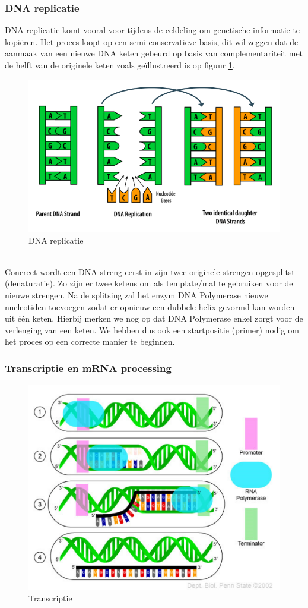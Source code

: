 \documentclass[a4paper,kul]{kulakarticle} %
\begin{document}
\subsubsection{DNA replicatie}
DNA replicatie komt vooral voor tijdens de celdeling om genetische informatie te kopiëren. Het proces loopt op een semi-conservatieve basis, dit wil zeggen dat de aanmaak van een nieuwe DNA keten gebeurd op basis van complementariteit met de helft van de originele keten zoals geïllustreerd is op figuur \ref{fig:dnareplicatie}.\\ 
\begin{figure}[h]
	\centering
	\includegraphics[width=0.7\linewidth]{DNAReplicatie}
	\caption[DNA replicatie]{DNA replicatie}
	\label{fig:dnareplicatie}
\end{figure}\\
Concreet wordt een DNA streng eerst in zijn twee originele strengen opgesplitst (denaturatie). Zo zijn er twee ketens om als template/mal te gebruiken voor de nieuwe strengen. Na de splitsing zal het enzym DNA Polymerase nieuwe nucleotiden toevoegen zodat er opnieuw een dubbele helix gevormd kan worden uit één keten. Hierbij merken we nog op dat DNA Polymerase enkel zorgt voor de verlenging van een keten. We hebben dus ook een startpositie (primer) nodig om het proces op een correcte manier te beginnen.

\subsubsection{Transcriptie en mRNA processing}
\begin{figure}[h]
	\centering
	\includegraphics[width=0.7\linewidth]{Transcriptie}
	\caption[Transcriptie]{Transcriptie}
	\label{fig:transcriptie}
\end{figure}
\end{document}
